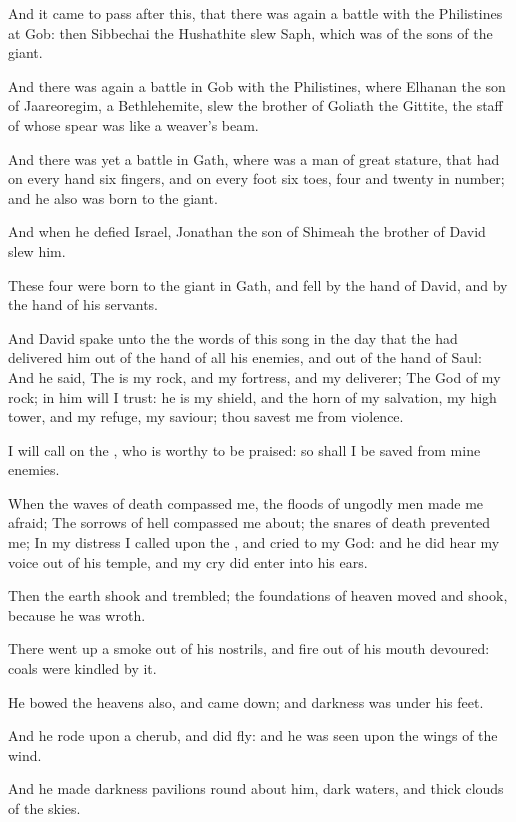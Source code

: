 \Verse And it came to pass after this, that there was again a battle with the Philistines at Gob: then Sibbechai the Hushathite slew Saph, which was of the sons of the giant.

\Verse And there was again a battle in Gob with the Philistines, where Elhanan the son of Jaareoregim, a Bethlehemite, slew the brother of Goliath the Gittite, the staff of whose spear was like a weaver's beam.

\Verse And there was yet a battle in Gath, where was a man of great stature, that had on every hand six fingers, and on every foot six toes, four and twenty in number; and he also was born to the giant.

\Verse And when he defied Israel, Jonathan the son of Shimeah the brother of David slew him.

\Verse These four were born to the giant in Gath, and fell by the hand of David, and by the hand of his servants.


\Chapter
\Verse And David spake unto the \LORD the words of this song in the day that the \LORD had delivered him out of the hand of all his enemies, and out of the hand of Saul: \Verse And he said, The \LORD is my rock, and my fortress, and my deliverer; \Verse The God of my rock; in him will I trust: he is my shield, and the horn of my salvation, my high tower, and my refuge, my saviour; thou savest me from violence.

\Verse I will call on the \LORD, who is worthy to be praised: so shall I be saved from mine enemies.

\Verse When the waves of death compassed me, the floods of ungodly men made me afraid; \Verse The sorrows of hell compassed me about; the snares of death prevented me; \Verse In my distress I called upon the \LORD, and cried to my God: and he did hear my voice out of his temple, and my cry did enter into his ears.

\Verse Then the earth shook and trembled; the foundations of heaven moved and shook, because he was wroth.

\Verse There went up a smoke out of his nostrils, and fire out of his mouth devoured: coals were kindled by it.

\Verse He bowed the heavens also, and came down; and darkness was under his feet.

\Verse And he rode upon a cherub, and did fly: and he was seen upon the wings of the wind.

\Verse And he made darkness pavilions round about him, dark waters, and thick clouds of the skies.

